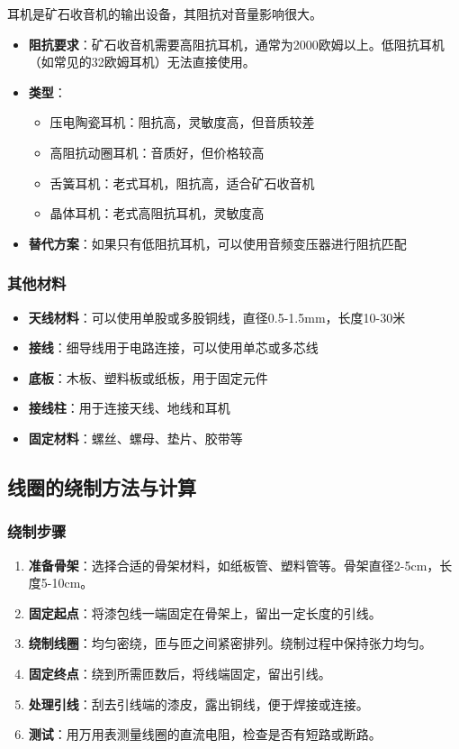 \documentclass[12pt,UTF8]{ctexbook}
\begin{document}
耳机是矿石收音机的输出设备，其阻抗对音量影响很大。

\begin{itemize}[leftmargin=3.5em]
    \item \textbf{阻抗要求}：矿石收音机需要高阻抗耳机，通常为2000欧姆以上。低阻抗耳机（如常见的32欧姆耳机）无法直接使用。
    \item \textbf{类型}：
        \begin{itemize}[leftmargin=3.5em]
            \item 压电陶瓷耳机：阻抗高，灵敏度高，但音质较差
            \item 高阻抗动圈耳机：音质好，但价格较高
            \item 舌簧耳机：老式耳机，阻抗高，适合矿石收音机
            \item 晶体耳机：老式高阻抗耳机，灵敏度高
        \end{itemize}
    \item \textbf{替代方案}：如果只有低阻抗耳机，可以使用音频变压器进行阻抗匹配
\end{itemize}

\subsubsection{其他材料}

\begin{itemize}[leftmargin=3.5em]
    \item \textbf{天线材料}：可以使用单股或多股铜线，直径0.5-1.5mm，长度10-30米
    \item \textbf{接线}：细导线用于电路连接，可以使用单芯或多芯线
    \item \textbf{底板}：木板、塑料板或纸板，用于固定元件
    \item \textbf{接线柱}：用于连接天线、地线和耳机
    \item \textbf{固定材料}：螺丝、螺母、垫片、胶带等
\end{itemize}

\subsection{线圈的绕制方法与计算}

\subsubsection{绕制步骤}

\begin{enumerate}[leftmargin=3.5em]
    \item \textbf{准备骨架}：选择合适的骨架材料，如纸板管、塑料管等。骨架直径2-5cm，长度5-10cm。
    \item \textbf{固定起点}：将漆包线一端固定在骨架上，留出一定长度的引线。
    \item \textbf{绕制线圈}：均匀密绕，匝与匝之间紧密排列。绕制过程中保持张力均匀。
    \item \textbf{固定终点}：绕到所需匝数后，将线端固定，留出引线。
    \item \textbf{处理引线}：刮去引线端的漆皮，露出铜线，便于焊接或连接。
    \item \textbf{测试}：用万用表测量线圈的直流电阻，检查是否有短路或断路。
\end{enumerate}
\end{document}

